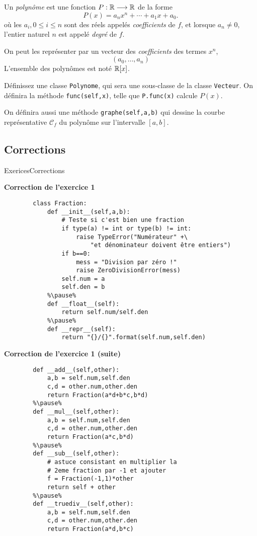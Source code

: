 \begin{frame}[fragile]
	\begin{exo}[Polynômes]
		Un \textit{polynôme} est une fonction $P:\mathbb R\longrightarrow\mathbb R$ de la forme
		\[
		P(x)  = a_nx^n + \cdots + a_1x + a_0.
		\]
		où les $a_i,0\leq i\leq n$ sont des réels appelés \textit{coefficients} de $f$, et lorsque $a_n\neq 0$, l'entier naturel $n$ est appelé \textit{degré} de $f$.\pause
		
		On peut les représenter par un vecteur des \textit{coefficients} des termes $x^n$,
		\[
		(a_0,\ldots,a_n)
		\]
		L'ensemble des polynômes est noté $\mathbb R[x]$.\pause
		
		Définissez une classe \lstinline|Polynome|, qui sera une sous-classe de la classe \lstinline|Vecteur|. On définira la méthode \lstinline|func(self,x)|, telle que \lstinline|P.func(x)| calcule $P(x)$. \pause
		
		On définira aussi une méthode \lstinline|graphe(self,a,b)| qui dessine la courbe représentative $\mathcal{C}_f$ du polynôme sur l'intervalle $[a,b]$.
	\end{exo}
\end{frame}


\subsection{Corrections}

\begin{frame}[fragile]{Exerices}{Corrections}
	\begin{block}{\textbf{Correction de l'exercice 1}}
		\begin{lstlisting}
		class Fraction:
			def __init__(self,a,b):
				# Teste si c'est bien une fraction
				if type(a) != int or type(b) != int:
					raise TypeError("Numérateur" +\ 
						"et dénominateur doivent être entiers")
				if b==0:
					mess = "Division par zéro !"
					raise ZeroDivisionError(mess)
				self.num = a
				self.den = b
			%\pause%
			def __float__(self):
				return self.num/self.den
			%\pause%
			def __repr__(self):
				return "{}/{}".format(self.num,self.den)
		\end{lstlisting}
	\end{block}
\end{frame}

\begin{frame}[fragile]
	\begin{block}{\textbf{Correction de l'exercice 1 (suite)}}
		\begin{lstlisting}
		def __add__(self,other):
			a,b = self.num,self.den
			c,d = other.num,other.den
			return Fraction(a*d+b*c,b*d)
		%\pause%
		def __mul__(self,other):
			a,b = self.num,self.den
			c,d = other.num,other.den
			return Fraction(a*c,b*d)
		%\pause%
		def __sub__(self,other):
			# astuce consistant en multiplier la
			# 2eme fraction par -1 et ajouter
			f = Fraction(-1,1)*other
			return self + other
		%\pause%
		def __truediv__(self,other):
			a,b = self.num,self.den
			c,d = other.num,other.den
			return Fraction(a*d,b*c)
		\end{lstlisting}
	\end{block}
\end{frame}

